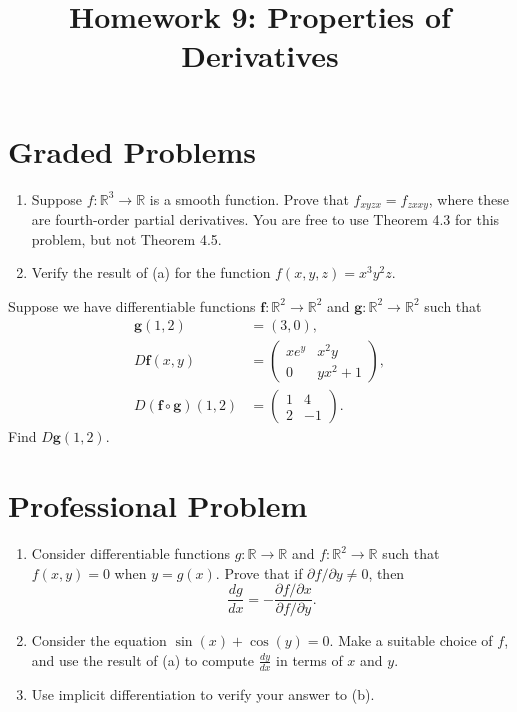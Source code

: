 \documentclass{ximera}
\title{Homework 9: Properties of Derivatives}
\begin{document}
\begin{abstract}
\end{abstract}
\maketitle

\section*{Graded Problems}



\begin{problem} \begin{enumerate}
\item Suppose $f:\mathbb{R}^3\rightarrow\mathbb{R}$ is a smooth function. Prove that $f_{xyzx} = f_{zxxy}$, where these are fourth-order partial derivatives. You are free to use Theorem 4.3 for this problem, but not Theorem 4.5.
\item Verify the result of (a) for the function $f(x,y,z) = x^3y^2z$.
\end{enumerate}
\end{problem}

\begin{problem} Suppose we have differentiable functions $\mathbf{f}:\mathbb{R}^2\rightarrow\mathbb{R}^2$ and $\mathbf{g}:\mathbb{R}^2\rightarrow\mathbb{R}^2$ such that
\begin{align*}
\mathbf{g}(1,2) &= (3,0),\\
D\mathbf{f}(x,y) &= \left(\begin{array}{cc} xe^y & x^2y \\ 0 & yx^2+1\end{array}\right),\\
D(\mathbf{f}\circ\mathbf{g})(1,2) &= \left(\begin{array}{cc} 1 & 4 \\ 2 & -1\end{array}\right).
\end{align*}
Find $D\mathbf{g}(1,2)$.
\end{problem}

\section*{Professional Problem}

\begin{problem} \begin{enumerate}
\item Consider differentiable functions $g:\mathbb{R}\rightarrow\mathbb{R}$ and $f:\mathbb{R}^2\rightarrow \mathbb{R}$ such that $f(x,y)=0$ when $y=g(x)$. Prove that if $\partial f/\partial y\neq 0$, then
\[
\frac{dg}{dx} = -\frac{\partial f/\partial x}{\partial f/\partial y}.
\]
\item Consider the equation $\sin(x) + \cos(y) = 0$.
Make a suitable choice of $f$, and use the result of (a) to compute $\frac{dy}{dx}$ in terms of $x$ and $y$.
\item Use implicit differentiation to verify your answer to (b).
\end{enumerate}
\end{problem}
\end{document}
